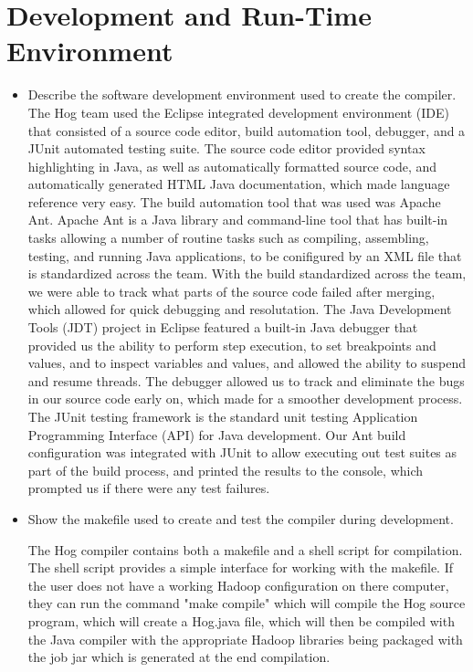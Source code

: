 \documentclass{report}
\begin{document}
\chapter{Development and Run-Time Environment}
\label{chap:environ}


\begin{itemize}
\item Describe the software development environment used to create the compiler.
	The Hog team used the Eclipse integrated development environment (IDE) that consisted of a
source code editor, build automation tool, debugger, and a  JUnit automated testing suite. The source
code editor provided syntax highlighting in Java, as well as automatically formatted source code, and automatically generated HTML Java documentation, which made language reference very easy. The 
build automation tool that was used was Apache Ant. Apache Ant is a Java library and command-line tool
that has built-in tasks allowing a number of routine tasks such as compiling, assembling, testing, and running Java applications, to be conifigured by an XML file that is standardized across the team. With the build standardized across the team, we were able to track what parts of the source code failed after merging,
which allowed for quick debugging and resolutation. The Java Development Tools (JDT) project in Eclipse featured a built-in Java debugger that provided us the ability to perform step execution, to set breakpoints and values, and to inspect variables and values, and allowed the ability to suspend and resume threads. The debugger allowed us to track and eliminate the bugs in our source code early on, which made for a smoother
development process. The JUnit testing framework is the standard unit testing Application Programming Interface (API) for Java development. Our Ant build configuration was integrated with JUnit to allow executing 
out test suites as part of the build process, and printed the results to the console, which prompted us if there
were any test failures. 


\item Show the makefile used to create and test the compiler during development.

	The Hog compiler contains both a makefile and a shell script for compilation. 
The shell script provides a simple interface for working with the makefile. If the user
does not have a working Hadoop configuration on there computer, they can run the
command "make compile" which will compile the Hog source program, which will 
create a Hog.java file, which will then be compiled with the Java compiler with the appropriate
Hadoop libraries being packaged with the job jar which is generated at the end compilation.


\end{itemize}
\end{document}
